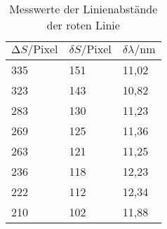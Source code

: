 
\begin{table}[H]
  \centering
  \caption{Messwerte der Linienabstände der roten Linie}
  \label{tab:tabe2}
    \begin{tabular}{l l l}
    \toprule
    $ \increment S / \text{Pixel} $ & $ \delta S / \text{Pixel}$ & $ \delta \lambda / \si{\nano\meter}$\\
    \midrule
    335 & 151 & 11,02 \\
    323 & 143 & 10,82 \\
    283 & 130 & 11,23 \\
    269 & 125 & 11,36 \\
    263 & 121 & 11,25 \\
    236 & 118 & 12,23 \\
    222 & 112 & 12,34 \\
    210 & 102 & 11,88 \\

          \bottomrule
        \end{tabular}
    \end{table}
